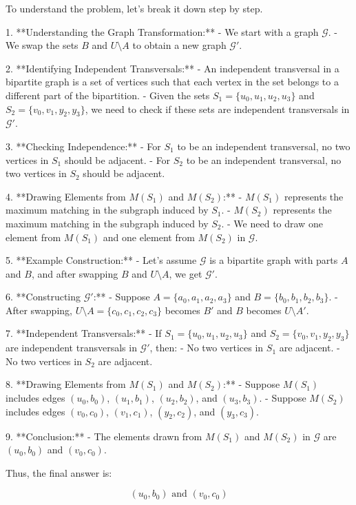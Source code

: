 To understand the problem, let's break it down step by step.

1. **Understanding the Graph Transformation:**
   - We start with a graph \(\mathcal{G}\).
   - We swap the sets \(B\) and \(U \setminus A\) to obtain a new graph \(\mathcal{G}'\).

2. **Identifying Independent Transversals:**
   - An independent transversal in a bipartite graph is a set of vertices such that each vertex in the set belongs to a different part of the bipartition.
   - Given the sets \(S_1 = \{u_0, u_1, u_2, u_3\}\) and \(S_2 = \{v_0, v_1, y_2, y_3\}\), we need to check if these sets are independent transversals in \(\mathcal{G}'\).

3. **Checking Independence:**
   - For \(S_1\) to be an independent transversal, no two vertices in \(S_1\) should be adjacent.
   - For \(S_2\) to be an independent transversal, no two vertices in \(S_2\) should be adjacent.

4. **Drawing Elements from \(M(S_1)\) and \(M(S_2)\):**
   - \(M(S_1)\) represents the maximum matching in the subgraph induced by \(S_1\).
   - \(M(S_2)\) represents the maximum matching in the subgraph induced by \(S_2\).
   - We need to draw one element from \(M(S_1)\) and one element from \(M(S_2)\) in \(\mathcal{G}\).

5. **Example Construction:**
   - Let's assume \(\mathcal{G}\) is a bipartite graph with parts \(A\) and \(B\), and after swapping \(B\) and \(U \setminus A\), we get \(\mathcal{G}'\).

6. **Constructing \(\mathcal{G}'\):**
   - Suppose \(A = \{a_0, a_1, a_2, a_3\}\) and \(B = \{b_0, b_1, b_2, b_3\}\).
   - After swapping, \(U \setminus A = \{c_0, c_1, c_2, c_3\}\) becomes \(B'\) and \(B\) becomes \(U \setminus A'\).

7. **Independent Transversals:**
   - If \(S_1 = \{u_0, u_1, u_2, u_3\}\) and \(S_2 = \{v_0, v_1, y_2, y_3\}\) are independent transversals in \(\mathcal{G}'\), then:
     - No two vertices in \(S_1\) are adjacent.
     - No two vertices in \(S_2\) are adjacent.

8. **Drawing Elements from \(M(S_1)\) and \(M(S_2)\):**
   - Suppose \(M(S_1)\) includes edges \((u_0, b_0)\), \((u_1, b_1)\), \((u_2, b_2)\), and \((u_3, b_3)\).
   - Suppose \(M(S_2)\) includes edges \((v_0, c_0)\), \((v_1, c_1)\), \((y_2, c_2)\), and \((y_3, c_3)\).

9. **Conclusion:**
   - The elements drawn from \(M(S_1)\) and \(M(S_2)\) in \(\mathcal{G}\) are \((u_0, b_0)\) and \((v_0, c_0)\).

Thus, the final answer is:

\[
\boxed{(u_0, b_0) \text{ and } (v_0, c_0)}
\]